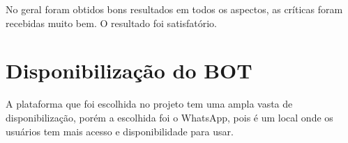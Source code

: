 \begin{itemize}
No geral foram obtidos bons resultados em todos os aspectos, as críticas foram recebidas muito bem. O resultado foi satisfatório. 

\section{Disponibilização do BOT}

 A plataforma que foi escolhida no projeto tem uma ampla vasta de disponibilização, porém a escolhida foi o WhatsApp, pois é um local onde os usuários tem mais acesso e disponibilidade para usar.
		
\end{itemize}

